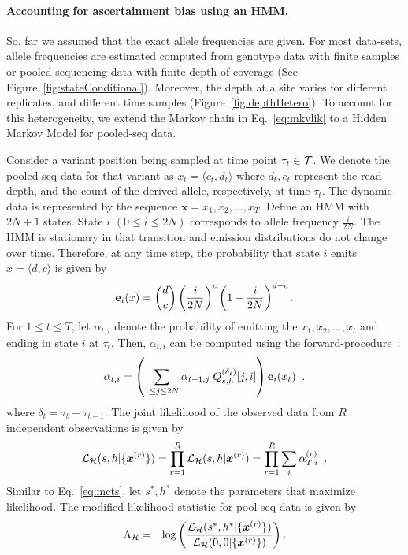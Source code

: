 \documentclass[11pt]{article}
\begin{document}
\paragraph{Accounting for ascertainment bias using an HMM.}
So, far we assumed that the exact allele frequencies are given. For
most data-sets, allele frequencies are estimated computed from
genotype data with finite samples or pooled-sequencing data with
finite depth of coverage (See Figure~\ref{fig:stateConditional}).
Moreover, the depth at a site varies for different replicates, and
different time samples (Figure~\ref{fig:depthHetero}). To account for
this heterogeneity, we extend the Markov chain in Eq.~\ref{eq:mkvlik}
to a Hidden Markov Model for pooled-seq data.

Consider a variant position being sampled at time point $\tau_t\in
{\cal T}$. We denote the pooled-seq data for that variant as $x_t =
\langle c_t,d_t \rangle$ where $d_t, c_t$ represent the read depth,
and the count of the derived allele, respectively, at time
$\tau_t$. The dynamic data is represented by the sequence
$\mathbf{x}=x_1,x_2,\ldots,x_T$. Define an HMM with $2N+1$
states. State $i$ $(0\le i\le 2N)$ corresponds to allele frequency
$\frac{i}{2N}$. The HMM is stationary in that transition and emission
distributions do not change over time. Therefore, at any time step,
the probability that state $i$ emits $x=\langle d, c\rangle $ is given by
\begin{equation*}
{\bf e}_{i}(x) = {d \choose c} \left(\frac{i}{2N} \right)^c\left (1- \frac{i}{2N} \right)^{d-c}.
\end{equation*}
For $1\le t\le T$, let $\alpha_{t,i}$ denote the probability of
emitting the $x_1,x_2,\ldots,x_t$ and ending in state $i$ at
$\tau_t$. Then, $\alpha_{t,i}$ can be computed using the
forward-procedure~\cite{durbin1998biological}:
\begin{equation}
  \alpha_{t,i} = \left( \sum_{1\le j\le 2N} \alpha_{t-1,j}\;Q^{(\delta_t)}_{s,h}[j,i] \right) {\bf e}_{i}(x_t)\;\; .
  \label{eq:hmm}
\end{equation}
where $\delta_t=\tau_t-\tau_{t-1}$. The joint likelihood of the
observed data from $R$ independent observations is given by
\begin{equation}
  {\cal L}_{{\cal H}}(s,h|\{\bm{x}^{(r)}\})=\prod_{r=1}^R{\cal L}_{{\cal H}}(s,h|\bm{x}^{(r)}) = \prod_{r=1}^R \sum_i\alpha_{T,i}^{(r)}\;\;.
  \label{eq:hmmlik}
\end{equation}
Similar to Eq.~\ref{eq:mcts}, let $s^*,h^*$ denote the parameters that
maximize likelihood. The modified likelihood statistic for pool-seq
data is given by
\begin{eqnarray}
\Lambda_{\cal H} &=& \log 
\left(\frac{{\cal L}_{\cal H}(s^*,h^*|\{\bm{x}^{(r)}\})}{{\cal L}_{\cal H}(0,0|\{\bm{x}^{(r)}\})}\right).
\label{eq:hmmml}
\end{eqnarray}
\end{document}
